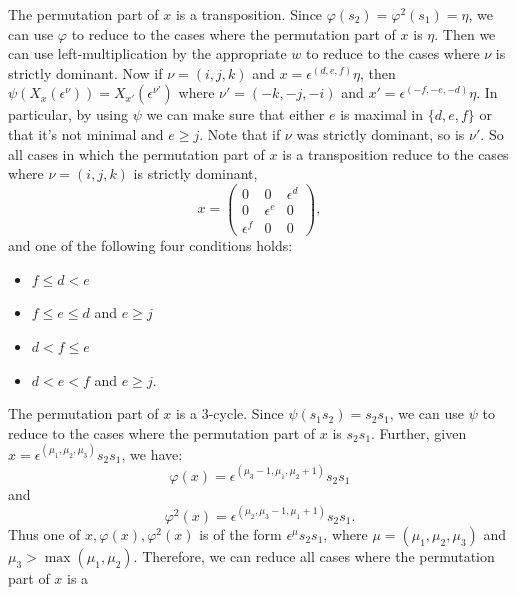 \documentclass{amsart}
\theoremstyle{definition}
\def\e{\epsilon}
\def\en{\e^{\nu}}
\def\emu{\e^{\mu}}
\def\X{X_x(\en)}
\def\phi{\varphi}
\newenvironment{caselist}
	       {\begin{list}{\underline{Case \arabic{enumi}}:}
		   {\usecounter{enumi}
		     \setlength{\itemindent}{0.5in}
		     \setlength{\leftmargin}{0in}
		     \setlength{\rightmargin}{0in}
	       }}
	       {\end{list}}
\begin{document}
\begin{caselist}
    \item The permutation part of $x$ is a transposition.  Since $\phi(s_2) =
      \phi^2(s_1) = \eta$, we can use $\phi$ to reduce to the cases where the
      permutation part of $x$ is $\eta$.  Then we can use left-multiplication
      by the appropriate $w$ to reduce to the cases where $\nu$ is strictly
      dominant.  Now if $\nu = (i, j, k)$ and $x = \e^{(d,e,f)}\eta$, then
      $\psi(\X) = X_{x'}(\e^{\nu'})$ where $\nu' = (-k, -j, -i)$ and $x' =
      \e^{(-f, -e, -d)}\eta$.  In particular, by using $\psi$ we can make sure
      that either $e$ is maximal in $\{d,e,f\}$ or that it's not minimal and $e
      \ge j$.  Note that if $\nu$ was strictly dominant, so is $\nu'$.  So all
      cases in which the permutation part of $x$ is a transposition reduce to
      the cases where $\nu = (i, j, k)$ is strictly dominant,
      \begin{equation*}
        x = \begin{pmatrix}
          0 & 0 & \e^d \\
          0 & \e^e & 0 \\
          \e^f & 0 & 0
        \end{pmatrix},
      \end{equation*}
      and one of the following four conditions holds:
      \begin{itemize}
      \item $f \le d < e$
      \item $f \le e \le d$ and $e \ge j$
      \item $d < f \le e$
      \item $d < e < f$ and $e \ge j$.
      \end{itemize}
    \item The permutation part of $x$ is a 3-cycle.  Since $\psi(s_1s_2) =
      s_2s_1$, we can use $\psi$ to reduce to the cases where the permutation
      part of $x$ is $s_2s_1$.  Further, given $x = \e^{(\mu_1, \mu_2,
        \mu_3)}s_2s_1$, we have:
      \begin{equation*}
        \phi(x) = \e^{(\mu_3-1, \mu_1, \mu_2 + 1)} s_2s_1
      \end{equation*}
      and
      \begin{equation*}
        \phi^2(x) = \e^{(\mu_2, \mu_3-1, \mu_1 + 1)} s_2s_1.
      \end{equation*}
      Thus one of $x, \phi(x), \phi^2(x)$ is of the form $\emu s_2s_1$, where
      $\mu = (\mu_1, \mu_2, \mu_3)$ and $\mu_3 > \max(\mu_1, \mu_2)$.
      Therefore, we can reduce all cases where the permutation part of $x$ is a

\end{caselist}
\end{document}
